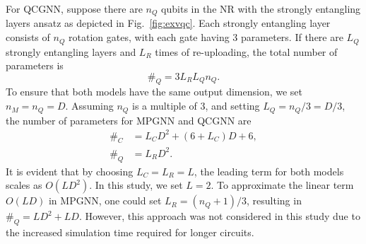 \documentclass[reprint,amsmath,amssymb,prd,nofootinbib]{revtex4-2}
\begin{document}
For QCGNN, suppose there are $n_Q$ qubits in the NR with the strongly entangling layers ansatz as depicted in Fig.~\ref{fig:exvqc}. Each strongly entangling layer consists of $n_Q$ rotation gates, with each gate having 3 parameters. If there are $L_Q$ strongly entangling layers and $L_R$ times of re-uploading, the total number of parameters is
\begin{equation}
    \#_Q = 3 L_R L_Q n_Q.
\end{equation}
To ensure that both models have the same output dimension, we set $n_M = n_Q = D$. Assuming $n_Q$ is a multiple of 3, and setting $L_Q = n_Q / 3 = D / 3$, the number of parameters for MPGNN and QCGNN are
\begin{equation}
    \begin{split}
        \#_C &= L_C D^2 + (6+L_C)D + 6,\\
        \#_Q &= L_R D^2.
    \end{split}
\end{equation}
It is evident that by choosing $L_C = L_R = L$, the leading term for both models scales as $O(LD^2)$. In this study, we set $L = 2$. To approximate the linear term $O(LD)$ in MPGNN, one could set $L_R = (n_Q + 1) / 3$, resulting in $\#_Q = LD^2 + LD$. However, this approach was not considered in this study due to the increased simulation time required for longer circuits.


\end{document}
